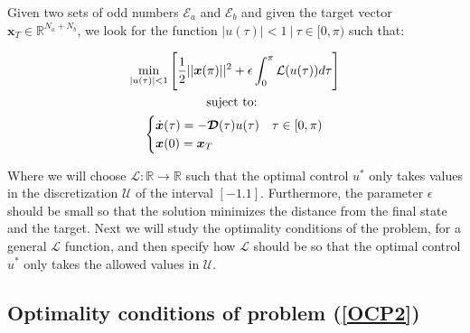 \begin{problem}\label{OCP2}
    Given two sets of odd numbers $ \mathcal {E} _a $ and $ \mathcal {E} _b $ and given the target vector $ \bm {x} _T \in \mathbb {R} ^ {N_a + N_b} $, we look for the function $ |u (\tau)|<1 \ | \ \tau \in [0, \pi) $ such that:

    \begin{gather}
        \min_{|u(\tau) |<1}         
         \Bigg[ \frac{1}{2}|| \bm{x}(\pi)  ||^2  
        + \epsilon \int_0^{\pi} \mathcal{L}(u(\tau)) d\tau \Bigg]  \\
        \notag \text{suject to: } \\
        \begin{cases}
            \dot{\bm{x}}(\tau) = -\bm{\mathcal{D}}(\tau) u(\tau)  & \tau \in [0,\pi)\\
            \bm{x}(0) = \bm{x}_T
        \end{cases}
    \end{gather}
\end{problem}
Where we will choose $ \mathcal {L}: \mathbb {R} \rightarrow \mathbb {R} $ such that the optimal control $ u^* $ only takes values in the discretization $ \mathcal {U} $ of the interval $ [- 1.1] $. Furthermore, the parameter $ \epsilon $ should be small so that the solution minimizes the distance from the final state and the target.
%
Next we will study the optimality conditions of the problem, for a general $ \mathcal {L} $ function, and then specify how $ \mathcal {L} $ should be so that the optimal control $ u ^ * $ only takes the allowed values in $ \mathcal {U} $.

\subsection{Optimality conditions of problem (\ref{OCP2})}

